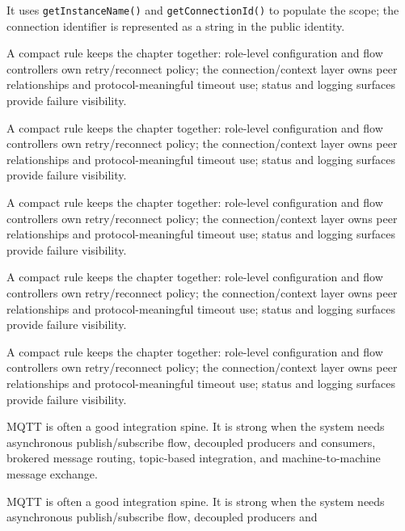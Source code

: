 \documentclass[
  a4paper,
  openany]{book}
\providecommand{\passthrough}[1]{#1}
\begin{document}
It uses \passthrough{\lstinline!getInstanceName()!} and
\passthrough{\lstinline!getConnectionId()!} to populate the scope; the
connection identifier is represented as a string in the public identity.\par
\clearpage
{}
A compact rule keeps the chapter together: role-level configuration and
flow controllers own retry/reconnect policy; the connection/context
layer owns peer relationships and protocol-meaningful timeout use;
status and logging surfaces provide failure visibility.\par
\clearpage
{}
A compact rule keeps the chapter together: role-level configuration and
flow controllers own retry/reconnect policy; the connection/context
layer owns peer relationships and protocol-meaningful timeout use;
status and logging surfaces provide failure visibility.\par
\clearpage
{}
A compact rule keeps the chapter together: role-level configuration and
flow controllers own retry/reconnect policy; the connection/context
layer owns peer relationships and protocol-meaningful timeout use;
status and logging surfaces provide failure visibility.\par
\clearpage
{}
\begingroup\raggedright A compact rule keeps the chapter together: role-level configuration and
flow controllers own retry/reconnect policy; the connection/context
layer owns peer relationships and protocol-meaningful timeout use;
status and logging surfaces provide failure visibility.\par\endgroup
\clearpage
{}
A compact rule keeps the chapter together: role-level configuration and
flow controllers own retry/\allowbreak{}reconnect policy; the connection/\allowbreak{}context
layer owns peer relationships and protocol-meaningful timeout use;
status and logging surfaces provide failure visibility.\par
\clearpage
{}
MQTT is often a good integration spine. It is strong when the system
needs asynchronous publish/subscribe flow, decoupled producers and
consumers, brokered message routing, topic-based integration, and
machine-to-machine message exchange.\par
\clearpage
{}
MQTT is often a good integration spine. It is strong when the system
needs asynchronous publish/subscribe flow, decoupled producers and
\end{document}
